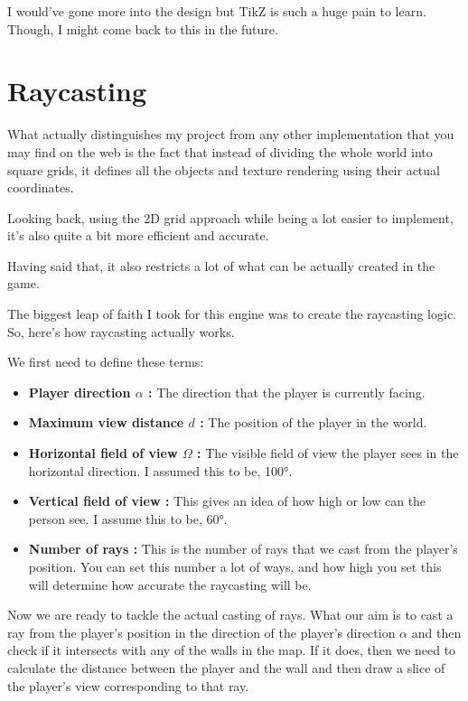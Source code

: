I would've gone more into the design but TikZ is such a huge pain to learn.  Though, I might come back to this in the future.

\section*{Raycasting}

What actually distinguishes my project from any other implementation that you may find on the web is the fact that instead of dividing the whole world into square grids, it defines all the objects and texture rendering using their actual coordinates.

Looking back, using the 2D grid approach while being a lot easier to implement, it's also quite a bit more efficient and accurate.

Having said that, it also restricts a lot of what can be actually created in the game.


The biggest leap of faith I took for this engine was to create the raycasting logic. So, here's how raycasting actually works.

We first need to define these terms:

\begin{itemize}

    \item \textbf{Player direction $\alpha$ :} The direction that the player is currently facing.
    \item \textbf{Maximum view distance $d$ :} The position of the player in the world.
    \item \textbf{Horizontal field of view $\Omega$ :} The visible field of view the player sees in the horizontal direction. I assumed this to be, 100°.
    \item \textbf{Vertical field of view :} This gives an idea of how high or low can the person see. I assume this to be, 60°.
    \item \textbf{Number of rays :} This is the number of rays that we cast from the player's position. You can set this number a lot of ways, and how high you set this will determine how accurate the raycasting will be.

\end{itemize}

\pagebreak

Now we are ready to tackle the actual casting of rays. What our aim is to cast a ray from the player's position in the direction of the player's direction $\alpha$ and then check if it intersects with any of the walls in the map. If it does, then we need to calculate the distance between the player and the wall and then draw a slice of the player's view corresponding to that ray.

